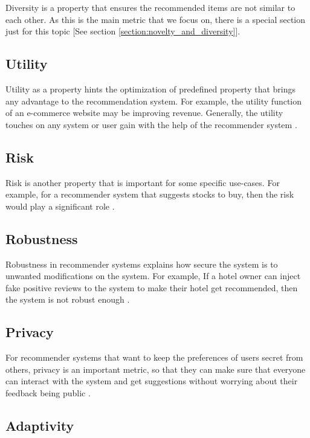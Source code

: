 Diversity is a property that ensures the recommended items are not similar to each other. As this is the main metric that we focus on, there is a special section just for this topic [See section \ref{section:novelty_and_diversity}].


\subsection{Utility}

Utility as a property hints the optimization of predefined property that brings any advantage to the recommendation system. For example, the utility function of an e-commerce website may be improving revenue. Generally, the utility touches on any system or user gain with the help of the recommender system \cite{shani2011evaluating}.

\subsection{Risk}

Risk is another property that is important for some specific use-cases. For example, for a recommender system that suggests stocks to buy, then the risk would play a significant role \cite{shani2011evaluating}.

\subsection{Robustness}

Robustness in recommender systems explains how secure the system is to unwanted modifications on the system. For example, If a hotel owner can inject fake positive reviews to the system to make their hotel get recommended, then the system is not robust enough \cite{shani2011evaluating}.

\subsection{Privacy}

For recommender systems that want to keep the preferences of users secret from others, privacy is an important metric, so that they can make sure that everyone can interact with the system and get suggestions without worrying about their feedback being public \cite{shani2011evaluating}.

\subsection{Adaptivity}

